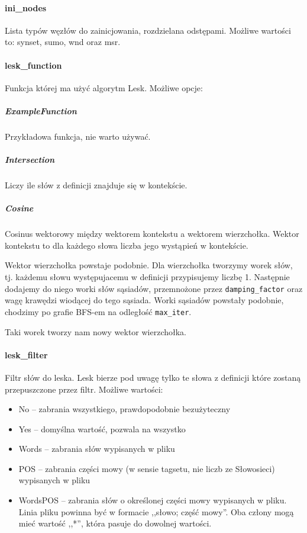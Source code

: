 \documentclass[10pt,a4paper]{article}
\begin{document}
\paragraph{ini\_nodes} %
Lista typów węzłów do zainicjowania, rozdzielana odstępami. Możliwe wartości to: synset, sumo, wnd oraz msr.

\paragraph{lesk\_function}
Funkcja której ma użyć algorytm Lesk. Możliwe opcje:

\subparagraph{ExampleFunction} Przykładowa funkcja, nie warto używać.

\subparagraph{Intersection} Liczy ile słów z definicji znajduje się w kontekście.

\subparagraph{Cosine} Cosinus wektorowy między wektorem kontekstu a wektorem wierzchołka. Wektor kontekstu to dla każdego słowa liczba jego wystąpień w kontekście. 

Wektor wierzchołka powstaje podobnie. Dla wierzchołka tworzymy worek słów, tj. każdemu słowu występujacemu w definicji przypisujemy liczbę 1. Następnie dodajemy do niego worki słów sąsiadów, przemnożone przez \texttt{damping\_factor} oraz wagę krawędzi wiodącej do tego sąsiada. Worki sąsiadów powstały podobnie, chodzimy po grafie BFS-em na odległość \texttt{max\_iter}.

Taki worek tworzy nam nowy wektor wierzchołka.


\paragraph{lesk\_filter}
Filtr słów do leska. Lesk bierze pod uwagę tylko te słowa z definicji które zostaną przepuszczone przez filtr. Możliwe wartości:
\begin{itemize}
	\item No -- zabrania wszystkiego, prawdopodobnie bezużyteczny
	\item Yes -- domyślna wartość, pozwala na wszystko
	\item Words -- zabrania słów wypisanych w pliku
	\item POS -- zabrania części mowy (w sensie tagsetu, nie liczb ze Słowosieci) wypisanych w pliku
	\item WordsPOS -- zabrania słów o określonej części mowy wypisanych w pliku. Linia pliku powinna być w formacie ,,słowo; część mowy''. Oba człony mogą mieć wartość ,,*'', która pasuje do dowolnej wartości.
\end{itemize}
\end{document}
